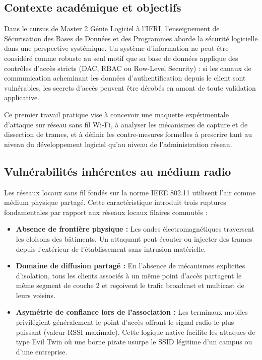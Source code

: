 \documentclass[a4paper,11pt]{article}
\begin{document}
\subsection{Contexte académique et objectifs}
Dans le cursus de Master 2 Génie Logiciel à l'IFRI, l'enseignement de Sécurisation des Bases de Données et des Programmes aborde la sécurité logicielle dans une perspective systémique. Un système d'information ne peut être considéré comme robuste au seul motif que sa base de données applique des contrôles d'accès stricts (DAC, RBAC ou Row-Level Security) : si les canaux de communication acheminant les données d'authentification depuis le client sont vulnérables, les secrets d'accès peuvent être dérobés en amont de toute validation applicative.

Ce premier travail pratique vise à concevoir une maquette expérimentale d'attaque sur réseau sans fil Wi-Fi, à analyser les mécanismes de capture et de dissection de trames, et à définir les contre-mesures formelles à prescrire tant au niveau du développement logiciel qu'au niveau de l'administration réseau.

\subsection{Vulnérabilités inhérentes au médium radio}
Les réseaux locaux sans fil fondés sur la norme IEEE 802.11 utilisent l'air comme médium physique partagé. Cette caractéristique introduit trois ruptures fondamentales par rapport aux réseaux locaux filaires commutés :
\begin{itemize}
  \item \textbf{Absence de frontière physique :} Les ondes électromagnétiques traversent les cloisons des bâtiments. Un attaquant peut écouter ou injecter des trames depuis l'extérieur de l'établissement sans intrusion matérielle.
  \item \textbf{Domaine de diffusion partagé :} En l'absence de mécanismes explicites d'isolation, tous les clients associés à un même point d'accès partagent le même segment de couche 2 et reçoivent le trafic broadcast et multicast de leurs voisins.
  \item \textbf{Asymétrie de confiance lors de l'association :} Les terminaux mobiles privilégient généralement le point d'accès offrant le signal radio le plus puissant (valeur RSSI maximale). Cette logique native facilite les attaques de type Evil Twin où une borne pirate usurpe le SSID légitime d'un campus ou d'une entreprise.
\end{itemize}
\end{document}
